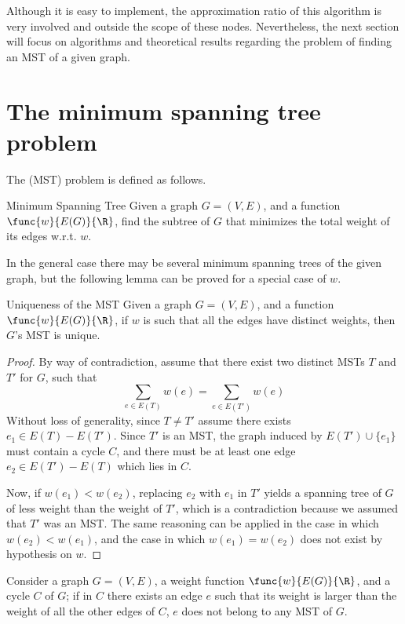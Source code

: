 \documentclass[a4paper, 12pt]{report}
\begin{document}
    Although it is easy to implement, the approximation ratio of this algorithm is very involved and outside the scope of these nodes. Nevertheless, the next section will focus on algorithms and theoretical results regarding the problem of finding an MST of a given graph.

    \section{The minimum spanning tree problem}

    The  (MST) problem is defined as follows.

    \begin{frameddefn}{Minimum Spanning Tree}
        Given a graph $G = (V, E)$, and a function $\func{w}{E(G)}{\R}$, find the subtree of $G$ that minimizes the total weight of its edges w.r.t. $w$.
    \end{frameddefn}

    In the general case there may be several minimum spanning trees of the given graph, but the following lemma can be proved for a special case of $w$.

    \begin{framedlem}{Uniqueness of the MST}
        Given a graph $G = (V, E)$, and a function $\func{w}{E(G)}{\R}$, if $w$ is such that all the edges have distinct weights, then $G$'s MST is unique.
    \end{framedlem}

    \begin{proof}
        By way of contradiction, assume that there exist two distinct MSTs $T$ and $T'$ for $G$, such that $$\sum_{e \in E(T)}{w(e)} = \sum_{e \in E(T')}{w(e)}$$ Without loss of generality, since $T \neq T'$ assume there exists $e_1 \in E(T) - E(T')$. Since $T'$ is an MST, the graph induced by $E(T') \cup \{e_1\}$ must contain a cycle $C$, and there must be at least one edge $e_2 \in E(T') - E(T)$ which lies in $C$.

        Now, if $w(e_1) < w(e_2)$, replacing $e_2$ with $e_1$ in $T'$ yields a spanning tree of $G$ of less weight than the weight of $T'$, which is a contradiction because we assumed that $T'$ was an MST. The same reasoning can be applied in the case in which $w(e_2) < w(e_1)$, and the case in which $w(e_1) = w(e_2)$ does not exist by hypothesis on $w$.
    \end{proof}

    \begin{framedlem}{}
        Consider a graph $G = (V, E)$, a weight function $\func{w}{E(G)}{\R}$, and a cycle $C$ of $G$; if in $C$ there exists an edge $e$ such that its weight is larger than the weight of all the other edges of $C$, $e$ does not belong to any MST of $G$.
    \end{framedlem}
    
\end{document}
